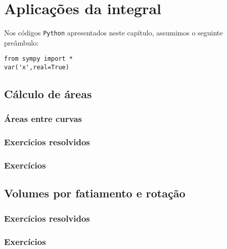 
\chapter{Aplicações da integral}\label{cap_apint}
\thispagestyle{fancy}

\ifispython
\begin{obs}\label{obs:cap_apint_python}
  Nos códigos \verb+Python+ apresentados neste capítulo, assumimos o seguinte preâmbulo:
\begin{verbatim}
from sympy import *
var('x',real=True)
\end{verbatim}
\end{obs}
\fi

\section{Cálculo de áreas}\label{cap_apint_sec_areas}

\emconstrucao

\subsection{Áreas entre curvas}

\emconstrucao

\subsection*{Exercícios resolvidos}

\emconstrucao

\subsection*{Exercícios}

\emconstrucao

\section{Volumes por fatiamento e rotação}\label{cap_apint_sec_volfat}

\emconstrucao

\subsection*{Exercícios resolvidos}

\emconstrucao

\subsection*{Exercícios}

\emconstrucao